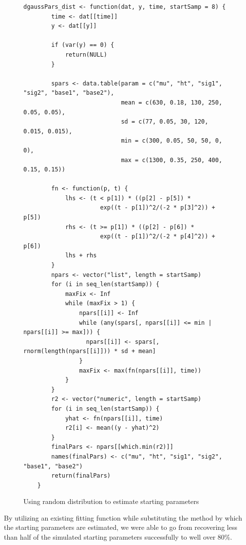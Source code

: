 \begin{singlespace}
\begin{figure}[H]
\centering
\begin{BVerbatim}
dgaussPars_dist <- function(dat, y, time, startSamp = 8) {
        time <- dat[[time]]
        y <- dat[[y]]
        
        if (var(y) == 0) {
            return(NULL)
        }
        
        spars <- data.table(param = c("mu", "ht", "sig1", "sig2", "base1", "base2"),
                            mean = c(630, 0.18, 130, 250, 0.05, 0.05), 
                            sd = c(77, 0.05, 30, 120, 0.015, 0.015), 
                            min = c(300, 0.05, 50, 50, 0, 0), 
                            max = c(1300, 0.35, 250, 400, 0.15, 0.15))
        
        fn <- function(p, t) {
            lhs <- (t < p[1]) * ((p[2] - p[5]) * 
                      exp((t - p[1])^2/(-2 * p[3]^2)) + p[5])
            rhs <- (t >= p[1]) * ((p[2] - p[6]) * 
                      exp((t - p[1])^2/(-2 * p[4]^2)) + p[6])
            lhs + rhs
        }
        npars <- vector("list", length = startSamp)
        for (i in seq_len(startSamp)) {
            maxFix <- Inf
            while (maxFix > 1) {
                npars[[i]] <- Inf
                while (any(spars[, npars[[i]] <= min | npars[[i]] >= max])) {
                  npars[[i]] <- spars[, rnorm(length(npars[[i]])) * sd + mean]
                }
                maxFix <- max(fn(npars[[i]], time))
            }
        }
        r2 <- vector("numeric", length = startSamp)
        for (i in seq_len(startSamp)) {
            yhat <- fn(npars[[i]], time)
            r2[i] <- mean((y - yhat)^2)
        }
        finalPars <- npars[[which.min(r2)]]
        names(finalPars) <- c("mu", "ht", "sig1", "sig2", "base1", "base2")
        return(finalPars)
    }
\end{BVerbatim}
\caption{Using random distribution to estimate starting parameters}
\label{fig:gauss_form_dist}
\end{figure}
\end{singlespace}

By utilizing an existing fitting function while substituting the method by which the starting parameters are estimated, we were able to go from recovering less than half of the simulated starting parameters successfully to well over 80\%.



